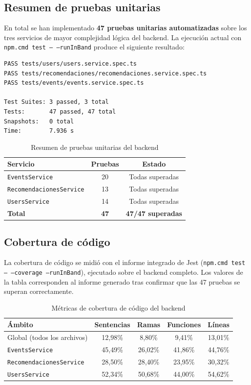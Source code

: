 \subsection{Resumen de pruebas unitarias}

En total se han implementado \textbf{47 pruebas unitarias automatizadas} sobre los tres servicios de mayor complejidad lógica del backend. La ejecución actual con \texttt{npm.cmd test -- --runInBand} produce el siguiente resultado:

\begin{verbatim}
PASS tests/users/users.service.spec.ts
PASS tests/recomendaciones/recomendaciones.service.spec.ts
PASS tests/events/events.service.spec.ts

Test Suites: 3 passed, 3 total
Tests:       47 passed, 47 total
Snapshots:   0 total
Time:        7.936 s
\end{verbatim}

\begin{table}[H]
\centering
\begin{tabular}{|l|c|c|}
\hline
\textbf{Servicio} & \textbf{Pruebas} & \textbf{Estado} \\
\hline
\texttt{EventsService} & 20 & Todas superadas \\
\hline
\texttt{RecomendacionesService} & 13 & Todas superadas \\
\hline
\texttt{UsersService} & 14 & Todas superadas \\
\hline
\textbf{Total} & \textbf{47} & \textbf{47/47 superadas} \\
\hline
\end{tabular}
\caption{Resumen de pruebas unitarias del backend}
\end{table}

\subsection{Cobertura de código}

La cobertura de código se midió con el informe integrado de Jest (\texttt{npm.cmd test -- --coverage --runInBand}), ejecutado sobre el backend completo. Los valores de la tabla corresponden al informe generado tras confirmar que las 47 pruebas se superan correctamente.

\begin{table}[H]
\centering
\caption{Métricas de cobertura de código del backend}
\label{tab:cobertura}
\begin{tabular}{|l|c|c|c|c|}
\hline
\textbf{Ámbito} & \textbf{Sentencias} & \textbf{Ramas} & \textbf{Funciones} & \textbf{Líneas} \\
\hline
Global (todos los archivos) & 12,98\% & 8,80\% & 9,41\% & 13,01\% \\
\hline
\texttt{EventsService} & 45,49\% & 26,02\% & 41,86\% & 44,76\% \\
\hline
\texttt{RecomendacionesService} & 28,50\% & 28,40\% & 23,95\% & 30,32\% \\
\hline
\texttt{UsersService} & 52,34\% & 50,68\% & 44,00\% & 54,62\% \\
\hline
\end{tabular}
\end{table}

